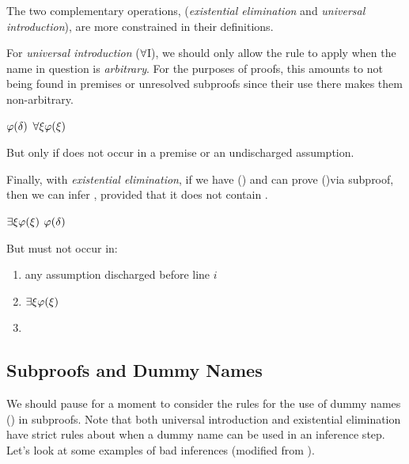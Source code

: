 The two complementary operations, (\emph{existential elimination} and
\emph{universal introduction}), are more constrained in their definitions.

For \emph{universal introduction} ($\forall$I), we should only allow the rule
to apply when the name in question is \emph{arbitrary}. For the purposes of
proofs, this amounts to not being found in premises or unresolved subproofs
since their use there makes them non-arbitrary.

\begin{fitchrule}
  \label{def:universal-introduction-rule}
  \leavevmode
  \vspace{-0.9\baselineskip}
  \begin{fitchproof}
     {$\varphi(\delta)$}    
     {$\forall\xi\varphi(\xi)$} 
  \end{fitchproof}
  But only if \edelta does not occur in a premise or an undischarged assumption.
\end{fitchrule}

Finally, with \emph{existential elimination}, if we have \eexists\exi\ephi(\exi)
and can prove \ephi(\edelta)\eif\epsi via subproof, then we can infer \epsi,
provided that it does not contain \edelta.

\begin{fitchrule}
  \label{def:existential-elimination-rule}
  \leavevmode
  \vspace{-0.9\baselineskip}
  \begin{fitchproof}
     {$\exists\xi\varphi(\xi)$}
    \open
     {$\varphi(\delta)$} 
     {\epsi}
    \close
     {\epsi} 
  \end{fitchproof}
  But \edelta must not occur in:
  \begin{enumerate}
  \item any assumption discharged before line $i$
  \item $\exists\xi\varphi(\xi)$
  \item \epsi
  \end{enumerate}
\end{fitchrule}

\subsection{Subproofs and Dummy Names}

We should pause for a moment to consider the rules for the use of dummy names
(\edelta) in subproofs. Note that both universal introduction and existential
elimination have strict rules about when a dummy name can be used in an
inference step. Let's look at some examples of bad inferences (modified from
\cite{Smi20}).

